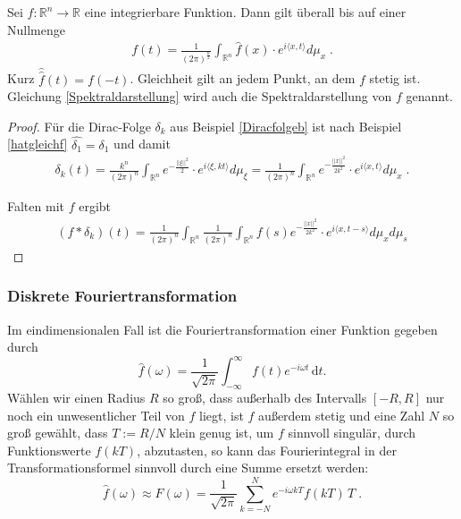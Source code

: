 \begin{Satz}[Umkehrsatz]
Sei $f :\mathbb{R}^n \to \mathbb{R}$ eine integrierbare Funktion. Dann gilt überall bis auf einer Nullmenge
\begin{align}
\label{Spektraldarstellung}
f(t) =  \frac{1}{ (2 \pi)^{\frac{n}{2}}}  \int_{\mathbb{R}^n} \hat{f}(x)  \cdot e^{i \langle x , t  \rangle } d \mu_{x}   \; .
\end{align}
Kurz $\hat{\hat{f}}(t) = f(-t)$. Gleichheit gilt an jedem Punkt, an dem $f$ stetig ist.
Gleichung \ref{Spektraldarstellung} wird auch die Spektraldarstellung von $f$ genannt.
\end{Satz}
\begin{proof}
Für die  Dirac-Folge $\delta_k$ aus Beispiel \ref{Diracfolgeb} ist nach Beispiel \ref{hatgleichf}  $\hat{\delta_1} = \delta_1$  und damit
\begin{align*}
\delta_k(t) =   \frac{k^n}{(2 \pi)^n} \int_{\mathbb{R}^n} e^{- \frac{|| \xi ||^2}{2}}  \cdot e^{i \langle \xi , k t  \rangle }  d \mu_{\xi}  
= \frac{1}{(2 \pi)^n} \int_{\mathbb{R}^n} e^{- \frac{|| x ||^2}{2k^2}}  \cdot e^{i \langle x ,  t  \rangle }  d \mu_{x}  \;.
\end{align*}

Falten mit  $f$ ergibt 
\begin{align*}
(f * \delta_k)(t) = \frac{1}{(2 \pi)^n} \int_{\mathbb{R}^n} \frac{1}{(2 \pi)^n} \int_{\mathbb{R}^n} f(s) e^{- \frac{|| x ||^2}{2k^2}}  \cdot e^{i \langle x ,  t - s  \rangle }  d \mu_{x}   d \mu_s
\end{align*}

\end{proof}
 
\begin{Satz}

\end{Satz}


\subsubsection{Diskrete Fouriertransformation}

Im eindimensionalen Fall ist die Fouriertransformation einer Funktion gegeben durch
$$
\hat f(\omega)= \frac{1}{\sqrt{2 \pi}} \int_{-\infty}^\infty f(t) e^{-i \omega t} \, \mathrm d t.
$$
Wählen wir einen Radius $R$ so groß, dass außerhalb des Intervalls $[-R,R]$ nur noch ein unwesentlicher Teil von $f$ liegt, ist $f$ außerdem stetig und eine Zahl $N$ so groß gewählt, dass $T:=R/N$ klein genug ist, um $f$ sinnvoll singulär,  durch Funktionswerte $f(kT)$, abzutasten, so kann das Fourierintegral in der Transformationsformel sinnvoll durch eine Summe ersetzt werden:
$$
\hat f(\omega)\approx F(\omega)=\frac{1}{\sqrt{2 \pi}} \sum_{k=-N}^N e^{-i \omega kT}f(kT) \,T \;.
$$


